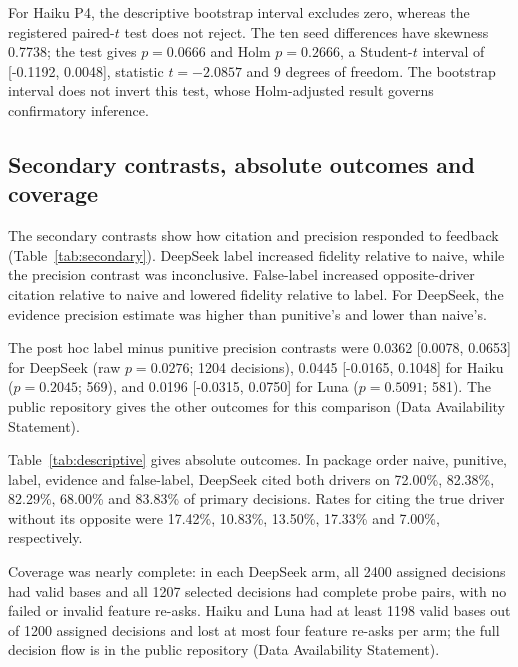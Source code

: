 \documentclass[futureinternet,article,submit,moreauthors,pdftex]{Definitions/mdpi}
\begin{document}
For Haiku P4, the descriptive bootstrap interval excludes zero, whereas the registered paired-$t$ test does not reject. The ten seed differences have skewness 0.7738; the test gives $p=0.0666$ and Holm $p=0.2666$, a Student-$t$ interval of [-0.1192, 0.0048], statistic $t=-2.0857$ and 9 degrees of freedom. The bootstrap interval does not invert this test, whose Holm-adjusted result governs confirmatory inference.

\subsection{Secondary contrasts, absolute outcomes and coverage}\label{sec:secondary}
The secondary contrasts show how citation and precision responded to feedback (Table~\ref{tab:secondary}). DeepSeek label increased fidelity relative to naive, while the precision contrast was inconclusive. False-label increased opposite-driver citation relative to naive and lowered fidelity relative to label. For DeepSeek, the evidence precision estimate was higher than punitive's and lower than naive's.

The post hoc label minus punitive precision contrasts were 0.0362 [0.0078, 0.0653] for DeepSeek (raw $p=0.0276$; 1204 decisions), 0.0445 [-0.0165, 0.1048] for Haiku ($p=0.2045$; 569), and 0.0196 [-0.0315, 0.0750] for Luna ($p=0.5091$; 581). The public repository gives the other outcomes for this comparison (Data Availability Statement).



Table~\ref{tab:descriptive} gives absolute outcomes. In package order naive, punitive, label, evidence and false-label, DeepSeek cited both drivers on 72.00\%, 82.38\%, 82.29\%, 68.00\% and 83.83\% of primary decisions. Rates for citing the true driver without its opposite were 17.42\%, 10.83\%, 13.50\%, 17.33\% and 7.00\%, respectively.

Coverage was nearly complete: in each DeepSeek arm, all 2400 assigned decisions had valid bases and all 1207 selected decisions had complete probe pairs, with no failed or invalid feature re-asks. Haiku and Luna had at least 1198 valid bases out of 1200 assigned decisions and lost at most four feature re-asks per arm; the full decision flow is in the public repository (Data Availability Statement).
\end{document}
